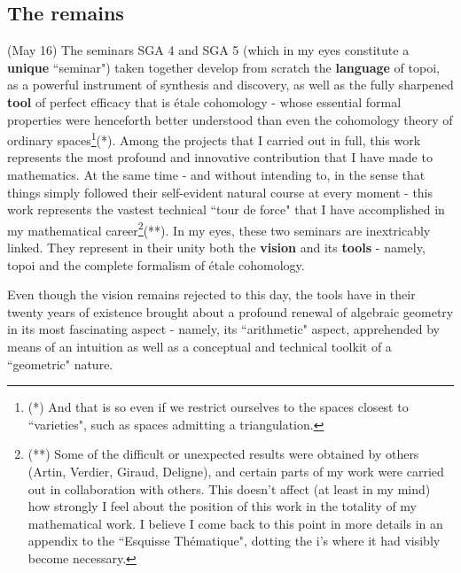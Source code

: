\subsection{The remains}

 (May 16) The seminars SGA 4 and SGA 5 (which in my eyes constitute a \textbf{unique} ``seminar") taken together develop from scratch the \textbf{language} of topoi, as a  powerful instrument of synthesis and discovery, as well as the fully sharpened \textbf{tool} of perfect efficacy that is \'etale cohomology - whose essential formal properties were henceforth better understood than even the cohomology theory of ordinary spaces\footnote{(*) And that is so even if we restrict ourselves to the spaces closest to ``varieties", such as spaces admitting a triangulation.}(*). Among the projects that I carried out in full, this work represents the most profound and innovative contribution that I have made to mathematics. At the same time - and without intending to, in the sense that things simply followed their self-evident natural course at every moment - this work represents the vastest technical ``tour de force" that I have accomplished in my mathematical career\footnote{(**) Some of the difficult or unexpected results were obtained by others (Artin, Verdier, Giraud, Deligne), and certain parts of my work were carried out in collaboration with others. This doesn't affect (at least in my mind) how strongly I feel about the position of this work in the totality of my mathematical work. I believe I come back to this point in more details in an appendix to the ``Esquisse Th\'ematique", dotting the i's where it had visibly become necessary.}(**). In my eyes, these two seminars are inextricably linked. They represent in their unity both the \textbf{vision} and its \textbf{tools} - namely, topoi and the complete formalism of \'etale cohomology.

Even though the vision remains rejected to this day, the tools have in their twenty years of existence brought about a profound renewal of algebraic geometry in its most fascinating aspect - namely, its ``arithmetic" aspect, apprehended by means of an intuition as well as a conceptual and technical toolkit of a ``geometric" nature. 

